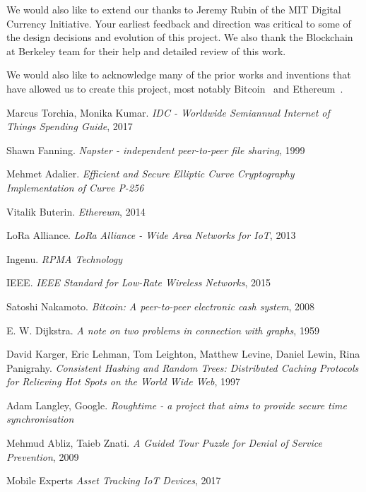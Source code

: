 \documentclass[10pt, nonatbib, nocopyrightspace, reprint]{sigplanconf}
\begin{document}
We would also like to extend our thanks to Jeremy Rubin of the MIT Digital Currency Initiative. Your earliest feedback and direction was critical to some of the design decisions and evolution of this project. We also thank the Blockchain at Berkeley team for their help and detailed review of this work.

We would also like to acknowledge many of the prior works and inventions that have allowed us to create this project, most notably Bitcoin~\cite{bitcoin} and Ethereum~\cite{ethereum}.
\newpage

\begin{thebibliography}{10}
\softraggedright

    Marcus Torchia, Monika Kumar.
    \emph{IDC - Worldwide Semiannual Internet of Things Spending Guide}, 2017

    Shawn Fanning.
    \emph{Napster - independent peer-to-peer file sharing}, 1999

    Mehmet Adalier.
    \emph{Efficient and Secure Elliptic Curve Cryptography Implementation of Curve P-256}

    Vitalik Buterin.
    \emph{Ethereum}, 2014

    LoRa Alliance.
    \emph{LoRa Alliance - Wide Area Networks for IoT}, 2013

    Ingenu.
    \emph{RPMA Technology}

    IEEE.
    \emph{IEEE Standard for Low-Rate Wireless Networks}, 2015

    Satoshi Nakamoto.
    \emph{Bitcoin: A peer-to-peer electronic cash system}, 2008

    E. W. Dijkstra.
    \emph{A note on two problems in connection with graphs}, 1959

    David Karger, Eric Lehman, Tom Leighton, Matthew Levine, Daniel Lewin, Rina Panigrahy.
    \emph{Consistent Hashing and Random Trees: Distributed Caching Protocols for Relieving Hot Spots on the World Wide Web}, 1997

    Adam Langley, Google.
    \emph{Roughtime - a project that aims to provide secure time synchronisation}

    Mehmud Abliz, Taieb Znati.
    \emph{A Guided Tour Puzzle for Denial of Service Prevention}, 2009

    Mobile Experts
    \emph{Asset Tracking IoT Devices}, 2017


\end{thebibliography}
\end{document}
